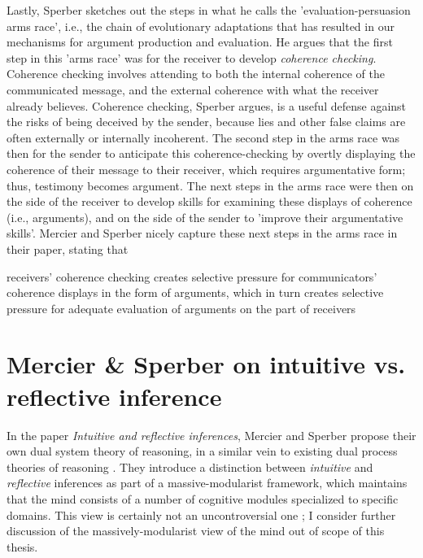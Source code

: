 Lastly, Sperber sketches out the steps in what he calls the 'evaluation-persuasion arms race', i.e., the chain of evolutionary adaptations that has resulted in our mechanisms for argument production and evaluation.
He argues that the first step in this 'arms race' was for the receiver to develop \emph{coherence checking}. Coherence checking involves attending to both the internal coherence of the communicated message, and the external coherence with what the receiver already believes. Coherence checking, Sperber argues, is a useful defense against the risks of being deceived by the sender, because lies and other false claims are often externally or internally incoherent.
The second step in the arms race was then for the sender to anticipate this coherence-checking by overtly displaying the coherence of their message to their receiver, which requires argumentative form; thus, testimony becomes argument.
The next steps in the arms race were then on the side of the receiver to develop skills for examining these displays of coherence (i.e., arguments), and on the side of the sender to 'improve their argumentative skills'.
Mercier and Sperber nicely capture these next steps in the arms race in their \citeyear{MS11} paper, stating that
\begin{quoting}
    receivers' coherence checking creates selective pressure for communicators' coherence displays in the form of arguments, which in turn creates selective pressure for adequate evaluation of arguments on the part of receivers
    \hfill \citep[p.~96]{MS11}
\end{quoting}

\section{Mercier \& Sperber on intuitive vs. reflective inference}
\label{sec:MS09}

In the \citeyear{MS09} paper \emph{Intuitive and reflective inferences}, Mercier and Sperber propose their own dual system theory of reasoning, in a similar vein to existing dual process theories of reasoning \citep{Sloman96, Evans03, Evans13, Kahneman11}.
They introduce a distinction between \emph{intuitive} and \emph{reflective} inferences as part of a massive-modularist framework, which maintains that the mind consists of a number of cognitive modules specialized to specific domains.
This view is certainly not an uncontroversial one \citep[cf.][\S 3.1]{Novaes18}; I consider further discussion of the massively-modularist view of the mind out of scope of this thesis.

